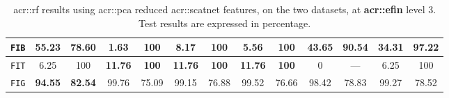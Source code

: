 \begin{sidewaystable}[htpb]
\begin{tabular}{| c | c c | c c | c c | c c | c c | c c |}
                    \hline
                    \texttt{FIB} & \textbf{55.23} & \textbf{78.60} & 1.63 & 100 & 8.17 & 100 & 5.56 & 100 & 43.65 & 90.54 & 34.31 & 97.22 \\
                    \hline
                    \texttt{FIT} & 6.25 & 100 & \textbf{11.76} & \textbf{100} & \textbf{11.76} & \textbf{100} & \textbf{11.76} & \textbf{100} & 0 & --- & 6.25 & 100 \\
                    \hline
                    \texttt{FIG} & \textbf{94.55} & \textbf{82.54} & 99.76 & 75.09 & 99.15 & 76.88 & 99.52 & 76.66 & 98.42 & 78.83 & 99.27 & 78.52 \\
                    \hline
                \end{tabular}
                \caption{
                    \label{tab::stats_scat_pca_rf_f3}
                    \gls{acr::rf} results using \gls{acr::pca} reduced \gls{acr::scatnet} features, on the two datasets, at \textbf{\gls{acr::efin}} level 3.
                    Test results are expressed in percentage.
                }
            \end{sidewaystable}

